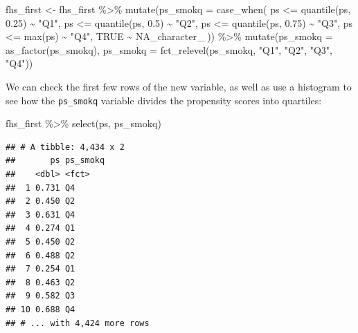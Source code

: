\documentclass[
]{book}
\newenvironment{Shaded}{\begin{snugshade}}{\end{snugshade}}
\newcommand{\AttributeTok}[1]{\textcolor[rgb]{0.77,0.63,0.00}{#1}}
\newcommand{\ConstantTok}[1]{\textcolor[rgb]{0.00,0.00,0.00}{#1}}
\newcommand{\FloatTok}[1]{\textcolor[rgb]{0.00,0.00,0.81}{#1}}
\newcommand{\FunctionTok}[1]{\textcolor[rgb]{0.00,0.00,0.00}{#1}}
\newcommand{\NormalTok}[1]{#1}
\newcommand{\OtherTok}[1]{\textcolor[rgb]{0.56,0.35,0.01}{#1}}
\newcommand{\SpecialCharTok}[1]{\textcolor[rgb]{0.00,0.00,0.00}{#1}}
\newcommand{\StringTok}[1]{\textcolor[rgb]{0.31,0.60,0.02}{#1}}
\begin{document}
\begin{Shaded}
\begin{Highlighting}[]
\NormalTok{fhs\_first }\OtherTok{\textless{}{-}}\NormalTok{ fhs\_first }\SpecialCharTok{\%\textgreater{}\%}
  \FunctionTok{mutate}\NormalTok{(}\AttributeTok{ps\_smokq =} \FunctionTok{case\_when}\NormalTok{(}
\NormalTok{    ps }\SpecialCharTok{\textless{}=} \FunctionTok{quantile}\NormalTok{(ps, }\FloatTok{0.25}\NormalTok{) }\SpecialCharTok{\textasciitilde{}} \StringTok{"Q1"}\NormalTok{, }
\NormalTok{    ps }\SpecialCharTok{\textless{}=} \FunctionTok{quantile}\NormalTok{(ps, }\FloatTok{0.5}\NormalTok{)  }\SpecialCharTok{\textasciitilde{}} \StringTok{"Q2"}\NormalTok{, }
\NormalTok{    ps }\SpecialCharTok{\textless{}=} \FunctionTok{quantile}\NormalTok{(ps, }\FloatTok{0.75}\NormalTok{) }\SpecialCharTok{\textasciitilde{}} \StringTok{"Q3"}\NormalTok{, }
\NormalTok{    ps }\SpecialCharTok{\textless{}=} \FunctionTok{max}\NormalTok{(ps)            }\SpecialCharTok{\textasciitilde{}} \StringTok{"Q4"}\NormalTok{, }
    \ConstantTok{TRUE} \SpecialCharTok{\textasciitilde{}} \ConstantTok{NA\_character\_}
\NormalTok{  )) }\SpecialCharTok{\%\textgreater{}\%} 
  \FunctionTok{mutate}\NormalTok{(}\AttributeTok{ps\_smokq =} \FunctionTok{as\_factor}\NormalTok{(ps\_smokq), }
         \AttributeTok{ps\_smokq =} \FunctionTok{fct\_relevel}\NormalTok{(ps\_smokq, }\StringTok{"Q1"}\NormalTok{, }\StringTok{"Q2"}\NormalTok{, }\StringTok{"Q3"}\NormalTok{, }\StringTok{"Q4"}\NormalTok{))}
\end{Highlighting}
\end{Shaded}

We can check the first few rows of the new variable, as well as use a histogram to see how the \texttt{ps\_smokq} variable divides the propensity scores into quartiles:

\begin{Shaded}
\begin{Highlighting}[]
\NormalTok{fhs\_first }\SpecialCharTok{\%\textgreater{}\%} 
  \FunctionTok{select}\NormalTok{(ps, ps\_smokq)}
\end{Highlighting}
\end{Shaded}

\begin{verbatim}
## # A tibble: 4,434 x 2
##       ps ps_smokq
##    <dbl> <fct>   
##  1 0.731 Q4      
##  2 0.450 Q2      
##  3 0.631 Q4      
##  4 0.274 Q1      
##  5 0.450 Q2      
##  6 0.488 Q2      
##  7 0.254 Q1      
##  8 0.463 Q2      
##  9 0.582 Q3      
## 10 0.688 Q4      
## # ... with 4,424 more rows
\end{verbatim}
\end{document}
